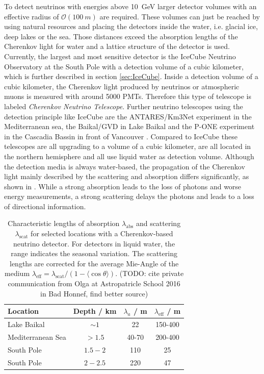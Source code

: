 To detect neutrinos with energies above \SI{10}{GeV} larger detector volumes with an effective radius of $\mathcal{O}(\SI{100}{m})$ are required.
These volumes can just be reached by using natural resources and placing the detectors inside the water, i.e. glacial ice, deep lakes or the sea.
Those distances exceed the absorption lengths of the Cherenkov light for water and a lattice structure of the detector is used.
Currently, the largest and most sensitive detector is the IceCube Neutrino Observatory at the South Pole with a detection volume of a cubic kilometer, which is further described in section \ref{sec:IceCube}.
Inside a detection volume of a cubic kilometer, the Cherenkov light produced by neutrinos or atmospheric muons is measured with around 5000 PMTs.
Therefore this type of telescope is labeled \textit{Cherenkov Neutrino Telescope}.
Further neutrino telescopes using the detection principle like IceCube are the ANTARES/Km3Net \cite{ANTARES11, KM3Net16} experiment in the Mediterranean sea, the Baikal/GVD in Lake Baikal \cite{Baikal97, GVD19} and the P-ONE experiment in the Cascadia Bassin in front of Vancouver \cite{PONE20}.
Compared to IceCube these telescopes are all upgrading to a volume of a cubic kilometer, are all located in the northern hemisphere and all use liquid water as detection volume.
Although the detection media is always water-based, the propagation of the Cherenkov light mainly described by the scattering and absorption differs significantly, as shown in .
While a strong absorption leads to the loss of photons and worse energy measurements, a strong scattering delays the photons and leads to a loss of directional information.
\begin{table}
    \caption{Characteristic lengths of absorption $\lambda_{\text{abs}}$ and scattering $\lambda_{\text{scat}}$ for selected locations with a Cherenkov-based neutrino detector. For detectors in liquid water, the range indicates the seasonal variation. The scattering lengths are corrected for the average Mie-Angle of the medium $\lambda_{\text{eff}}=\lambda_{\text{scat}}/(1-\langle\cos \theta\rangle)$. (TODO: cite private communication from Olga at Astropatricle School 2016 in Bad Honnef, find better source)}
    \label{tab:len_abs_scat}
    \begin{center}
    \begin{tabular}{l c c c}
        \toprule
        Location & Depth / km & $\lambda_a$ / m & $\lambda_{\text{eff}}$ / m \\
        \midrule
        Lake Baikal & $\sim 1$ & 22 & 150-400 \\
        Mediterranean Sea & $> 1.5$ & 40-70 & 200-400 \\
        South Pole & $1.5 - 2$ & 110 & 25 \\
        South Pole & $2 - 2.5$ & 220 & 47 \\
        \bottomrule
    \end{tabular}
    \end{center}
\end{table}


